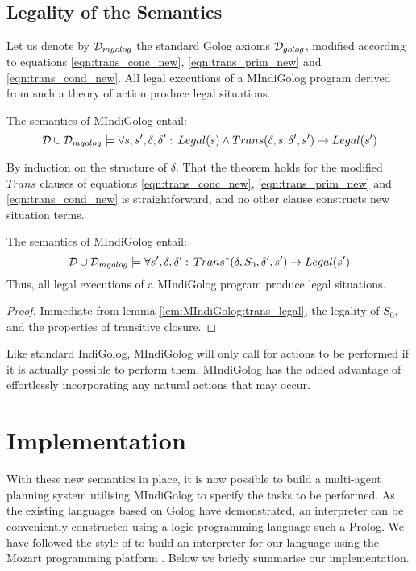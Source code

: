 \subsection{Legality of the Semantics}

Let us denote by $\mathcal{D}_{mgolog}$ the standard Golog axioms $\mathcal{D}_{golog}$,
modified according to equations \eqref{eqn:trans_conc_new}, \eqref{eqn:trans_prim_new}
and \eqref{eqn:trans_cond_new}. All legal executions of a MIndiGolog
program derived from such a theory of action produce legal situations.

\begin{lemma}
The semantics of MIndiGolog entail:\label{lem:MIndiGolog:trans_legal}\[
\mathcal{D}\cup\mathcal{D}_{mgolog}\models\forall s,s',\delta,\delta':\, Legal(s)\wedge Trans(\delta,s,\delta',s')\rightarrow Legal(s')\]

\end{lemma}
\begin{proofsketch}
By induction on the structure of $\delta$. That the theorem holds
for the modified $Trans$ clauses of equations \eqref{eqn:trans_conc_new},
\eqref{eqn:trans_prim_new} and \eqref{eqn:trans_cond_new} is straightforward,
and no other clause constructs new situation terms. 
\end{proofsketch}
\begin{thm}
The semantics of MIndiGolog entail: \[
\mathcal{D}\cup\mathcal{D}_{mgolog}\models\forall s',\delta,\delta':\, Trans^{*}(\delta,S_{0},\delta',s')\rightarrow Legal(s')\]
 Thus, all legal executions of a MIndiGolog program produce legal
situations. 
\end{thm}
\begin{proof}
Immediate from lemma \ref{lem:MIndiGolog:trans_legal}, the legality
of $S_{0}$, and the properties of transitive closure. 
\end{proof}
Like standard IndiGolog, MIndiGolog will only call for actions to
be performed if it is actually possible to perform them. MIndiGolog
has the added advantage of effortlessly incorporating any natural
actions that may occur.


\section{Implementation\label{sec:MIndiGolog:Implementation}}

With these new semantics in place, it is now possible to build a multi-agent
planning system utilising MIndiGolog to specify the tasks to be performed.
As the existing languages based on Golog have demonstrated, an interpreter
can be conveniently constructed using a logic programming language
such a Prolog. We have followed the style of \citep{giacomo00congolog,giacomo99indigolog}
to build an interpreter for our language using the Mozart programming
platform \citep{vanroy03mozart_logic}. Below we briefly summarise
our implementation.

